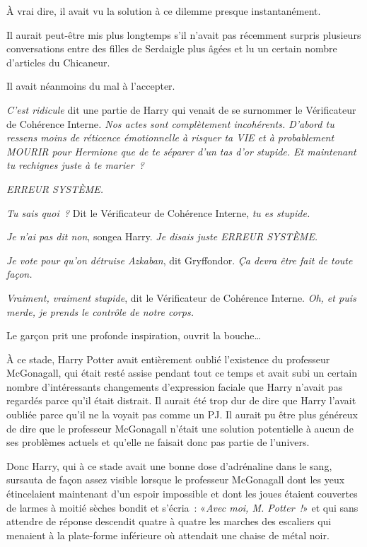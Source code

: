 À vrai dire, il avait vu la solution à ce dilemme presque instantanément.

Il aurait peut-être mis plus longtemps s'il n'avait pas récemment surpris plusieurs conversations entre des filles de Serdaigle plus âgées et lu un certain nombre d'articles du Chicaneur.

Il avait néanmoins du mal à l'accepter.

\emph{C'est ridicule} dit une partie de Harry qui venait de se surnommer le Vérificateur de Cohérence Interne\emph{. Nos actes sont complètement incohérents. D'abord tu ressens moins de réticence émotionnelle à risquer ta VIE et à probablement MOURIR pour Hermione que de te séparer d'un tas d'or stupide. Et maintenant tu rechignes juste à te marier~?}

\emph{ERREUR SYSTÈME.}

\emph{Tu sais quoi~?} Dit le Vérificateur de Cohérence Interne, \emph{tu es stupide.}

\emph{Je n'ai pas dit non}, songea Harry. \emph{Je disais juste ERREUR SYSTÈME.}

\emph{Je vote pour qu'on détruise Azkaban}, dit Gryffondor. \emph{Ça devra être fait de toute façon.}

\emph{Vraiment, vraiment stupide}, dit le Vérificateur de Cohérence Interne. \emph{Oh, et puis merde, je prends le contrôle de notre corps.}

Le garçon prit une profonde inspiration, ouvrit la bouche…

À ce stade, Harry Potter avait entièrement oublié l'existence du professeur McGonagall, qui était resté assise pendant tout ce temps et avait subi un certain nombre d'intéressants changements d'expression faciale que Harry n'avait pas regardés parce qu'il était distrait. Il aurait été trop dur de dire que Harry l'avait oubliée parce qu'il ne la voyait pas comme un PJ. Il aurait pu être plus généreux de dire que le professeur McGonagall n'était une solution potentielle à aucun de ses problèmes actuels et qu'elle ne faisait donc pas partie de l'univers.

Donc Harry, qui à ce stade avait une bonne dose d'adrénaline dans le sang, sursauta de façon assez visible lorsque le professeur McGonagall dont les yeux étincelaient maintenant d'un espoir impossible et dont les joues étaient couvertes de larmes à moitié sèches bondit et s'écria~: «\emph{Avec moi, M. Potter~!}» et qui sans attendre de réponse descendit quatre à quatre les marches des escaliers qui menaient à la plate-forme inférieure où attendait une chaise de métal noir.

